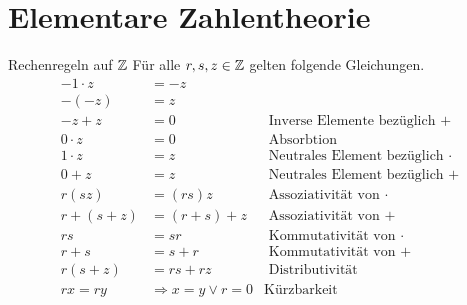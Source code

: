 \chapter{Elementare Zahlentheorie}

\begin{lemma}{Rechenregeln auf $\mathbb{Z}$}
Für alle $r,s,z\in\mathbb{Z}$ gelten folgende Gleichungen.
\begin{align*}
-1\cdot z&=-z\\
-(-z)&=z\\
-z+z&=0 &\text{ Inverse Elemente bezüglich }+\\
0\cdot z&=0 &\text{ Absorbtion}\\
1\cdot z&=z &\text{ Neutrales Element bezüglich }\cdot\\
0+z&=z &\text{ Neutrales Element bezüglich }+\\
r(sz)&=(rs)z &\text{ Assoziativität von } \cdot\\
r+(s+z)&=(r+s)+z &\text{ Assoziativität von }+\\
rs&=sr &\text{ Kommutativität von }\cdot\\
r+s&=s+r &\text{ Kommutativität von }+\\
r(s+z)&=rs+rz &\text{ Distributivität}\\
rx=ry&\Rightarrow x=y\lor r=0&\text{Kürzbarkeit}
\end{align*}
\end{lemma}


